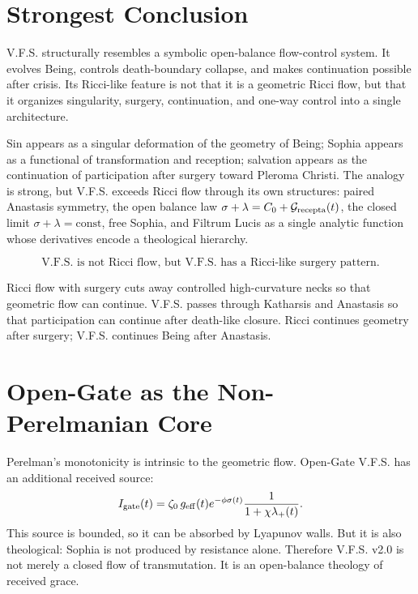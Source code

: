 \documentclass[11pt]{article}
\newcommand{\VFS}{V.F.S.}
\newcommand{\Gate}{I_{\rm gate}}
\newcommand{\Grec}{\mathcal{G}_{\rm recepta}}
\begin{document}
\section{Strongest Conclusion}

\VFS{} structurally resembles a symbolic open-balance flow-control system. It evolves Being, controls death-boundary collapse, and makes continuation possible after crisis. Its Ricci-like feature is not that it is a geometric Ricci flow, but that it organizes singularity, surgery, continuation, and one-way control into a single architecture.

Sin appears as a singular deformation of the geometry of Being; Sophia appears as a functional of transformation and reception; salvation appears as the continuation of participation after surgery toward Pleroma Christi. The analogy is strong, but \VFS{} exceeds Ricci flow through its own structures: paired Anastasis symmetry, the open balance law $\sigma+\lambda=C_0+\Grec(t)$, the closed limit $\sigma+\lambda=\mathrm{const}$, free Sophia, and Filtrum Lucis as a single analytic function whose derivatives encode a theological hierarchy.

\begin{equation}
\text{V.F.S. is not Ricci flow, but V.F.S. has a Ricci-like surgery pattern.}
\end{equation}

Ricci flow with surgery cuts away controlled high-curvature necks so that geometric flow can continue. \VFS{} passes through Katharsis and Anastasis so that participation can continue after death-like closure. Ricci continues geometry after surgery; \VFS{} continues Being after Anastasis.

\section{Open-Gate as the Non-Perelmanian Core}

Perelman's monotonicity is intrinsic to the geometric flow. Open-Gate \VFS{} has an additional received source:
\begin{equation}
\Gate(t)=\zeta_0\,g_{\rm eff}(t)e^{-\phi\sigma(t)}\frac{1}{1+\chi\lambda_+(t)}.
\end{equation}
This source is bounded, so it can be absorbed by Lyapunov walls. But it is also theological: Sophia is not produced by resistance alone. Therefore \VFS{} v2.0 is not merely a closed flow of transmutation. It is an open-balance theology of received grace.
\end{document}
